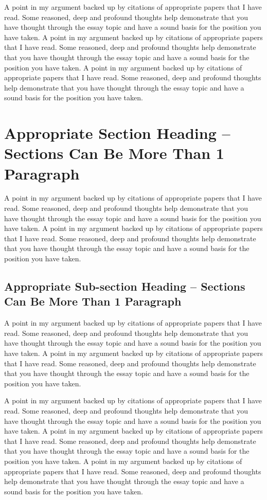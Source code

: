 \documentclass[12pt]{article}
\begin{document}
A point in my argument backed up by citations of appropriate papers that I have read. Some reasoned, deep and profound thoughts help demonstrate that you have thought through the essay topic and have a sound basis for the position you have taken. A point in my argument backed up by citations of appropriate papers that I have read. Some reasoned, deep and profound thoughts help demonstrate that you have thought through the essay topic and have a sound basis for the position you have taken. A point in my argument backed up by citations of appropriate papers that I have read. Some reasoned, deep and profound thoughts help demonstrate that you have thought through the essay topic and have a sound basis for the position you have taken. 


\section{Appropriate Section Heading – Sections Can Be More Than 1 Paragraph}
A point in my argument backed up by citations of appropriate papers that I have read. Some reasoned, deep and profound thoughts help demonstrate that you have thought through the essay topic and have a sound basis for the position you have taken. A point in my argument backed up by citations of appropriate papers that I have read. Some reasoned, deep and profound thoughts help demonstrate that you have thought through the essay topic and have a sound basis for the position you have taken. 

\subsection{Appropriate Sub-section Heading – Sections Can Be More Than 1 Paragraph}
A point in my argument backed up by citations of appropriate papers that I have read. Some reasoned, deep and profound thoughts help demonstrate that you have thought through the essay topic and have a sound basis for the position you have taken. A point in my argument backed up by citations of appropriate papers that I have read. Some reasoned, deep and profound thoughts help demonstrate that you have thought through the essay topic and have a sound basis for the position you have taken. 

A point in my argument backed up by citations of appropriate papers that I have read. Some reasoned, deep and profound thoughts help demonstrate that you have thought through the essay topic and have a sound basis for the position you have taken. A point in my argument backed up by citations of appropriate papers that I have read. Some reasoned, deep and profound thoughts help demonstrate that you have thought through the essay topic and have a sound basis for the position you have taken. A point in my argument backed up by citations of appropriate papers that I have read. Some reasoned, deep and profound thoughts help demonstrate that you have thought through the essay topic and have a sound basis for the position you have taken. 
\end{document}
